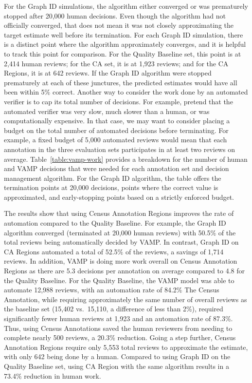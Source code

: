 For the Graph ID simulations, the algorithm either converged or was prematurely stopped after 20,000 human decisions.  Even though the algorithm had not officially converged, that does not mean it was not closely approximating the target estimate well before its termination.  For each Graph ID simulation, there is a distinct point where the algorithm approximately converges, and it is helpful to track this point for comparison.  For the Quality Baseline set, this point is at 2,414 human reviews; for the CA set, it is at 1,923 reviews; and for the CA Regions, it is at 642 reviews.  If the Graph ID algorithm were stopped prematurely at each of these junctures, the predicted estimates would have all been within 5\% correct.  Another way to consider the work done by an automated verifier is to cap its total number of decisions.  For example, pretend that the automated verifier was very slow, much slower than a human, or was computationally expensive.  In that case, we may want to consider placing a budget on the total number of automated decisions before terminating. For example, a fixed budget of 5,000 automated reviews would mean that each annotation in the three evaluation sets participates in at least two reviews on average.  Table~\ref{table:vamp-work} provides a breakdown for the number of human and VAMP decisions that were needed for each annotation set and decision management algorithm.  For the Graph ID algorithm, the table offers the termination points at 20,000 decisions, points where the correct value is approximated, and early-stopping points based on a strictly enforced budget.

The results show that using Census Annotation Regions improves the rate of automation compared to the Quality Baseline. For example, the Graph ID algorithm converged (terminated at 20,000 human reviews) with 50.5\% of the total reviews being automatically decided by VAMP.  In contrast, Graph ID on CA Regions automated a total of 52.5\% of the reviews, a savings of 1,714 reviews. In addition, VAMP is doing more work overall on Census Annotation Regions as there are 5.3 decisions per annotation on average compared to 4.8 for the Quality Baseline.  For the Quality Baseline, the VAMP model was able to automate 12,988 reviews, with an automation rate of 84.2\%  The Census Annotation, while requiring approximately the same number of overall reviews as the baseline set (15,402 vs.\ 15,110, a difference of less than 2\%), required significantly fewer human reviews at 1,923 and an automation rate of 87.3\%. Thus, using Census Annotations saved the human reviewers from needing to complete nearly 500 reviews, a 20.3\% reduction.  Going a step further, Census Annotation Regions require only 5,553 total reviews to approximate the estimate, with only 642 being done by a human.  Compared to using Graph ID on the Quality Baseline set, using CA Region with the same algorithm results in a 73.4\% reduction in human work.

